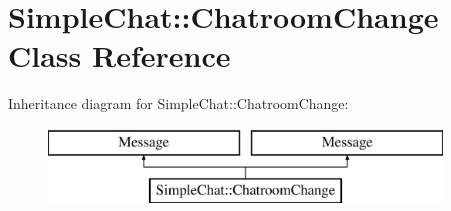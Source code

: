 \hypertarget{classSimpleChat_1_1ChatroomChange}{\section{Simple\-Chat\-:\-:Chatroom\-Change Class Reference}
\label{classSimpleChat_1_1ChatroomChange}
}
Inheritance diagram for Simple\-Chat\-:\-:Chatroom\-Change\-:\begin{figure}[H]
\begin{center}
\leavevmode
\includegraphics[height=2.000000cm]{classSimpleChat_1_1ChatroomChange}
\end{center}
\end{figure}
